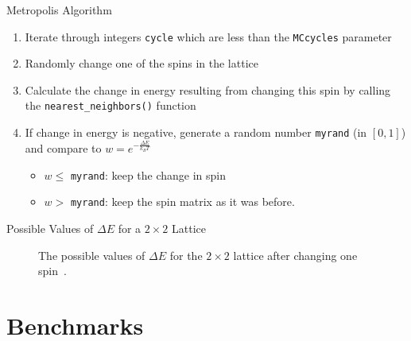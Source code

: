 \documentclass{beamer} %
\begin{document}
\begin{frame}{Metropolis Algorithm}
\begin{enumerate}
\item Iterate through integers \texttt{cycle} which are less than the \texttt{MCcycles} parameter
\item Randomly change one of the spins in the lattice 
\item Calculate the change in energy resulting from changing this spin by calling the \texttt{nearest\_neighbors()} function  
\item If change in energy is negative, generate a random number \texttt{myrand} (in $\left[0,1\right]$) and compare to $w=e^{-\frac{\Delta E}{k_{B}T}}$
\begin{itemize}
\item $w \leq$ \texttt{myrand}: keep the change in spin
\item $w >$ \texttt{myrand}: keep the spin matrix as it was before.
\end{itemize}
\end{enumerate}
\end{frame}

\begin{frame}{Possible Values of $\Delta E$ for a $2\times2$ Lattice}
\begin{figure}[ht]
\begin{center}
\caption{The possible values of $\Delta E$ for the $2\times2$ lattice after changing one spin~\cite{lecture}.}
\label{fig:deltaEs}
\end{center}
\end{figure}
\end{frame}

\section{Benchmarks}
\end{document}
